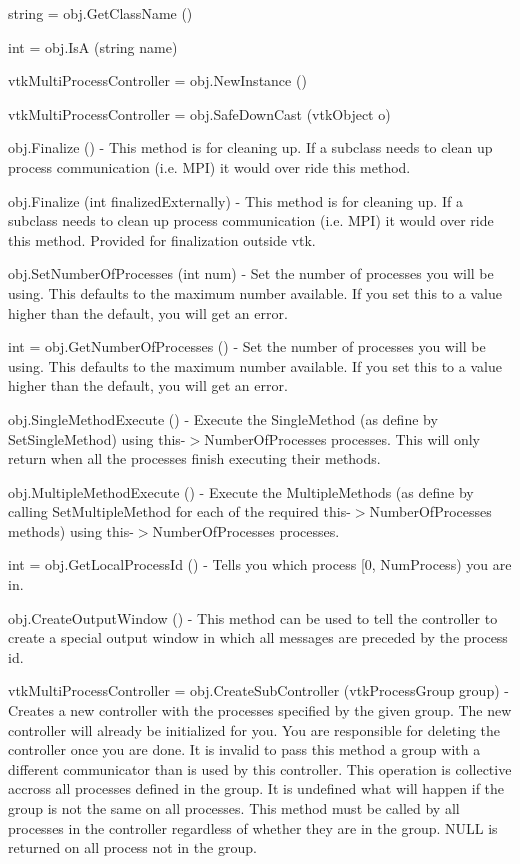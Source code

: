 \begin{DoxyItemize}
\item {\ttfamily string = obj.\-Get\-Class\-Name ()}  
\item {\ttfamily int = obj.\-Is\-A (string name)}  
\item {\ttfamily vtk\-Multi\-Process\-Controller = obj.\-New\-Instance ()}  
\item {\ttfamily vtk\-Multi\-Process\-Controller = obj.\-Safe\-Down\-Cast (vtk\-Object o)}  
\item {\ttfamily obj.\-Finalize ()} -\/ This method is for cleaning up. If a subclass needs to clean up process communication (i.\-e. M\-P\-I) it would over ride this method.  
\item {\ttfamily obj.\-Finalize (int finalized\-Externally)} -\/ This method is for cleaning up. If a subclass needs to clean up process communication (i.\-e. M\-P\-I) it would over ride this method. Provided for finalization outside vtk.  
\item {\ttfamily obj.\-Set\-Number\-Of\-Processes (int num)} -\/ Set the number of processes you will be using. This defaults to the maximum number available. If you set this to a value higher than the default, you will get an error.  
\item {\ttfamily int = obj.\-Get\-Number\-Of\-Processes ()} -\/ Set the number of processes you will be using. This defaults to the maximum number available. If you set this to a value higher than the default, you will get an error.  
\item {\ttfamily obj.\-Single\-Method\-Execute ()} -\/ Execute the Single\-Method (as define by Set\-Single\-Method) using this-\/$>$Number\-Of\-Processes processes. This will only return when all the processes finish executing their methods.  
\item {\ttfamily obj.\-Multiple\-Method\-Execute ()} -\/ Execute the Multiple\-Methods (as define by calling Set\-Multiple\-Method for each of the required this-\/$>$Number\-Of\-Processes methods) using this-\/$>$Number\-Of\-Processes processes.  
\item {\ttfamily int = obj.\-Get\-Local\-Process\-Id ()} -\/ Tells you which process \mbox{[}0, Num\-Process) you are in.  
\item {\ttfamily obj.\-Create\-Output\-Window ()} -\/ This method can be used to tell the controller to create a special output window in which all messages are preceded by the process id.  
\item {\ttfamily vtk\-Multi\-Process\-Controller = obj.\-Create\-Sub\-Controller (vtk\-Process\-Group group)} -\/ Creates a new controller with the processes specified by the given group. The new controller will already be initialized for you. You are responsible for deleting the controller once you are done. It is invalid to pass this method a group with a different communicator than is used by this controller. This operation is collective accross all processes defined in the group. It is undefined what will happen if the group is not the same on all processes. This method must be called by all processes in the controller regardless of whether they are in the group. N\-U\-L\-L is returned on all process not in the group.  

\end{DoxyItemize}

